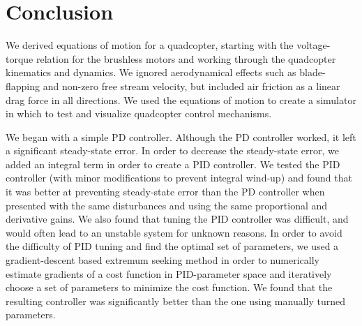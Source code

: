 \documentclass{article}
\begin{document}
\section*{Conclusion}
We derived equations of motion for a quadcopter, starting with the voltage-torque relation for the
brushless motors and working through the quadcopter kinematics and dynamics. We ignored
aerodynamical effects such as blade-flapping and non-zero free stream velocity, but included air
friction as a linear drag force in all directions. We used the equations of motion to create a
simulator in which to test and visualize quadcopter control mechanisms.

We began with a simple PD controller. Although the PD controller worked, it left a significant
steady-state error. In order to decrease the steady-state error, we added an integral term in order
to create a PID controller. We tested the PID controller (with minor modifications to prevent
integral wind-up) and found that it was better at preventing steady-state error than the PD
controller when presented with the same disturbances and using the same proportional and derivative
gains. We also found that tuning the PID controller was difficult, and would often lead to an
unstable system for unknown reasons. In order to avoid the difficulty of PID tuning and find the
optimal set of parameters, we used a gradient-descent based extremum seeking method in order to
numerically estimate gradients of a cost function in PID-parameter space and iteratively choose a
set of parameters to minimize the cost function. We found that the resulting controller was
significantly better than the one using manually turned parameters.
\end{document}
